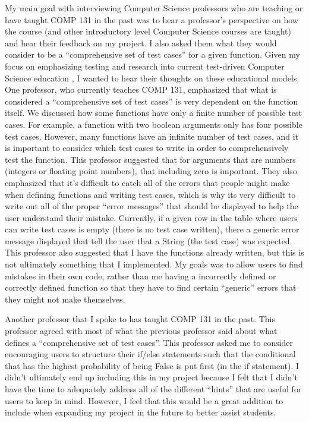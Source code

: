 \documentclass[10pt,twocolumn]{article}
\begin{document}
My main goal with interviewing Computer Science professors who are teaching or have taught COMP 131 in the past was to hear a professor's perspective on how the course (and other introductory level Computer Science courses are taught) and hear their feedback on my project. I also asked them what they would consider to be a \enquote{comprehensive set of test cases} for a given function. Given my focus on emphasizing testing and research into current test-driven Computer Science education \cite{Test-driven}\cite{Test-first}\cite{Teaching}, I wanted to hear their thoughts on these educational models. One professor, who currently teaches COMP 131, emphasized that what is considered a \enquote{comprehensive set of test cases} is very dependent on the function itself. We discussed how some functions have only a finite number of possible test cases. For example, a function with two boolean arguments only has four possible test cases. However, many functions have an infinite number of test cases, and it is important to consider which test cases to write in order to comprehensively test the function. This professor suggested that for arguments that are numbers (integers or floating point numbers), that including zero is important. They also emphasized that it's difficult to catch all of the errors that people might make when defining functions and writing test cases, which is why its very difficult to write out all of the proper \enquote{error messages} that should be displayed to help the user understand their mistake. Currently, if a given row in the table where users can write test cases is empty (there is no test case written), there a generic error message displayed that tell the user that a String (the test case) was expected. This professor also suggested that I have the functions already written, but this is not ultimately something that I implemented. My goals was to allow users to find mistakes in their own code, rather than me having a incorrectly defined or correctly defined function so that they have to find certain \enquote{generic} errors that they might not make themselves.

Another professor that I spoke to has taught COMP 131 in the past. This professor agreed with most of what the previous professor said about what defines a \enquote{comprehensive set of test cases}. This professor asked me to consider encouraging users to structure their if/else statements such that the conditional that has the highest probability of being False is put first (in the if statement). I didn't ultimately end up including this in my project because I felt that I didn't have the time to adequately address all of the different \enquote{hints} that are useful for users to keep in mind. However, I feel that this would be a great addition to include when expanding my project in the future to better assist students.
\end{document}
